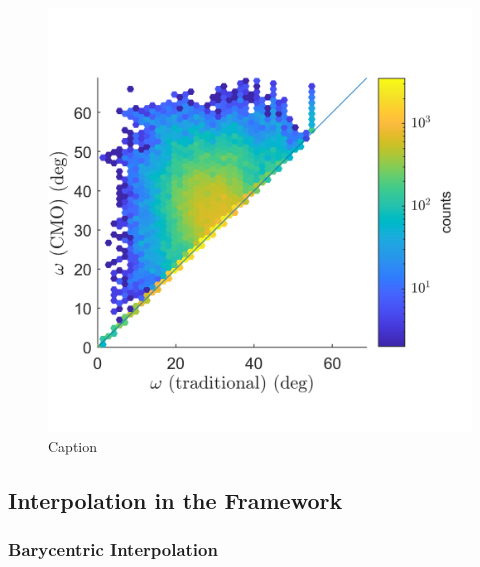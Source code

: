 \documentclass[preprint,12pt]{elsarticle}
\begin{document}
\begin{figure}
    \centering
    \includegraphics[scale=1]{dist-ensemble-k1.png}
    \caption{Caption}
    \label{fig:dist-ensemble-k1}
\end{figure}

\subsection{Interpolation in the  Framework}
\label{sec:methods:interp}

\subsubsection{Barycentric Interpolation}
\label{sec:methods:interp:bary}


\end{document}
